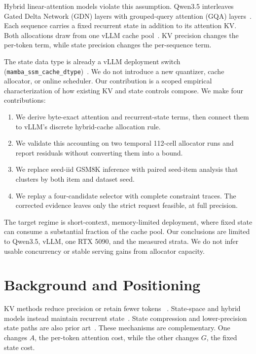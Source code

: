 \documentclass{article}
\begin{document}
Hybrid linear-attention models violate this assumption. Qwen3.5 interleaves
Gated Delta Network (GDN) layers with grouped-query attention (GQA)
layers~\cite{gateddeltanet,qwen35}. Each sequence carries a fixed recurrent
state in addition to its attention KV. Both allocations draw from one vLLM
cache pool~\cite{vllm}. KV precision changes the per-token term, while state
precision changes the per-sequence term.

The state data type is already a vLLM deployment switch
(\texttt{mamba\_ssm\_cache\_dtype})~\cite{vllmpr22196}. We do not introduce a
new quantizer, cache allocator, or online scheduler. Our contribution is a
scoped empirical characterization of how existing KV and state controls
compose. We make four contributions:

\begin{enumerate}
\item We derive byte-exact attention and recurrent-state terms, then connect
them to vLLM's discrete hybrid-cache allocation rule.
\item We validate this accounting on two temporal 112-cell allocator runs and
report residuals without converting them into a bound.
\item We replace seed-iid GSM8K inference with paired seed-item analysis that
clusters by both item and dataset seed.
\item We replay a four-candidate selector with complete constraint traces. The
corrected evidence leaves only the strict request feasible, at full precision.
\end{enumerate}

The target regime is short-context, memory-limited deployment, where fixed
state can consume a substantial fraction of the cache pool. Our conclusions
are limited to Qwen3.5, vLLM, one RTX 5090, and the measured strata. We do not
infer usable concurrency or stable serving gains from allocator capacity.

\section{Background and Positioning}
\label{sec:related}

KV methods reduce precision or retain fewer tokens
~\cite{kivi,kvquant,minikv,h2o,streamingllm,snapkv}. State-space and hybrid
models instead maintain recurrent state~\cite{mamba,mamba2,jamba,
recurrentgemma,zamba}. State compression and lower-precision state paths are
also prior art~\cite{replayssm,vllmpr22196,vllmpr43518}. These mechanisms are
complementary. One changes $A$, the per-token attention cost, while the other
changes $G$, the fixed state cost.
\end{document}
